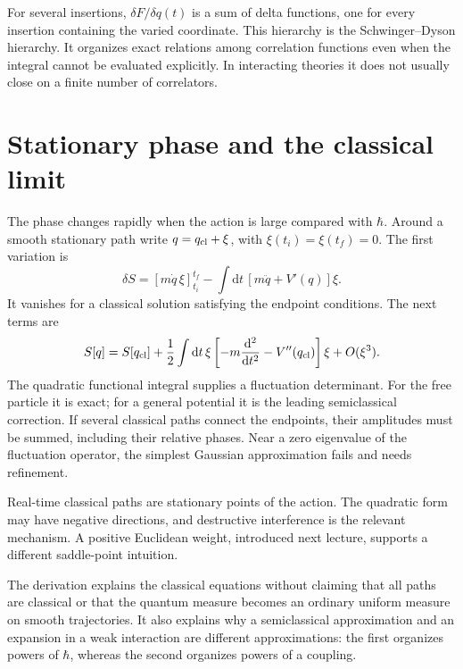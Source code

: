 \documentclass[11pt]{article}
\newcommand{\dd}{\mathrm d}
\newcommand{\module}[1]{\clearpage\section{#1}}
\begin{document}
For several insertions, \(\delta F/\delta q(t)\) is a sum of delta
functions, one for every insertion containing the varied coordinate.
This hierarchy is the Schwinger--Dyson hierarchy. It organizes exact
relations among correlation functions even when the integral cannot
be evaluated explicitly. In interacting theories it does not usually
close on a finite number of correlators.

\module{Stationary phase and the classical limit}
The phase changes rapidly when the action is large compared with
\(\hbar\). Around a smooth stationary path write \(q=q_{\rm cl}+\xi\),
with \(\xi(t_i)=\xi(t_f)=0\). The first variation is
\begin{equation}
 \delta S=[m\dot q\,\xi]_{t_i}^{t_f}
 -\int\dd t\,[m\ddot q+V'(q)]\xi.
\end{equation}
It vanishes for a classical solution satisfying the endpoint conditions.
The next terms are
\begin{equation}
 S[q]=S[q_{\rm cl}]+\frac12\int\dd t\,
 \xi\left[-m\frac{\dd^2}{\dd t^2}-V''(q_{\rm cl})\right]\xi
 +O(\xi^3).                                           \label{eq:saddle}
\end{equation}
The quadratic functional integral supplies a fluctuation determinant.
For the free particle it is exact; for a general potential it is the
leading semiclassical correction. If several classical paths connect
the endpoints, their amplitudes must be summed, including their
relative phases. Near a zero eigenvalue of the fluctuation operator,
the simplest Gaussian approximation fails and needs refinement.

\begin{remarkbox}
Real-time classical paths are stationary points of the action.
The quadratic form may have negative directions, and destructive
interference is the relevant mechanism. A positive Euclidean weight,
introduced next lecture, supports a different saddle-point intuition.
\end{remarkbox}

The derivation explains the classical equations without claiming that
all paths are classical or that the quantum measure becomes an ordinary
uniform measure on smooth trajectories. It also explains why a
semiclassical approximation and an expansion in a weak interaction are
different approximations: the first organizes powers of \(\hbar\),
whereas the second organizes powers of a coupling.
\end{document}
